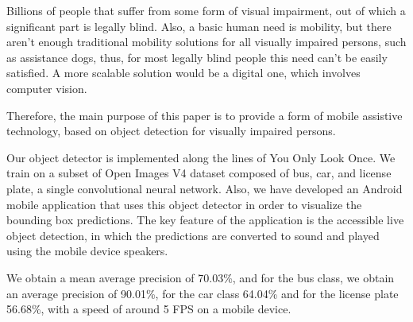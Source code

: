 Billions of people that suffer from some form of visual impairment, out of which a significant part is legally blind. Also, a basic human need is mobility, but there aren't enough traditional mobility solutions for all visually impaired persons, such as assistance dogs, thus, for most legally blind people this need can't be easily satisfied. A more scalable solution would be a digital one, which involves computer vision. %


Therefore, the main purpose of this paper is to provide a form of mobile assistive technology, based on object detection for visually impaired persons.



Our object detector is implemented along the lines of You Only Look Once. We train on a subset of Open Images V4 dataset composed of bus, car, and license plate, a single convolutional neural network. Also, we have developed an Android mobile application that uses this object detector in order to visualize the bounding box predictions. The key feature of the application is the accessible live object detection, in which the predictions are converted to sound and played using the mobile device speakers. %


We obtain a mean average precision of 70.03\%, and for the bus class, we obtain an average precision of 90.01\%, for the car class 64.04\% and for the license plate 56.68\%, with a speed of around 5 FPS on a mobile device. 


